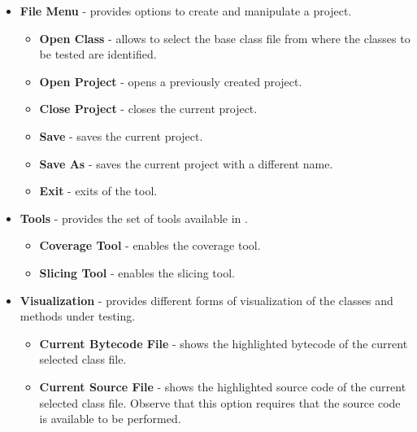 \begin{itemize}
    \item \textbf{File Menu} - provides options to create and
    manipulate a \toolname project.
        \begin{itemize}
            \item \textbf{Open Class} - allows to select the base class
            file from where the classes to be tested are
            identified.

            \item \textbf{Open Project} - opens a previously created
            project.

            \item \textbf{Close Project} - closes the current
            project.

            \item \textbf{Save} - saves the current project.

            \item \textbf{Save As} - saves the current project with a different
            name.

            \item \textbf{Exit} - exits of the tool.
        \end{itemize}

    \item \textbf{Tools} - provides the set of tools available in
    \toolname.
        \begin{itemize}
            \item \textbf{Coverage Tool} - enables the \toolname coverage
            tool.

            \item \textbf{Slicing Tool} - enables the \toolname slicing
            tool.

        \end{itemize}

    \item \textbf{Visualization} - provides different forms of
    visualization of the classes and methods under testing.
        \begin{itemize}
            \item \textbf{Current Bytecode File} - shows the highlighted bytecode of the
            current selected class file.

            \item \textbf{Current Source File} - shows the highlighted source code of the
            current selected class file. Observe that this option requires that the source
            code is available to be performed.


\end{itemize}
\end{itemize}
